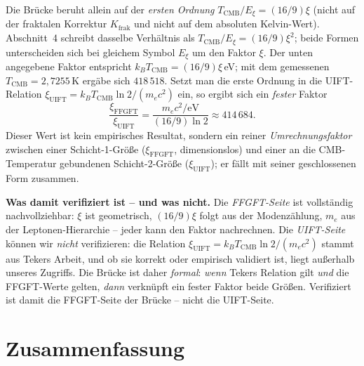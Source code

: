 Die Brücke beruht allein auf der \emph{ersten Ordnung}
$T_{\text{CMB}}/E_\xi = (16/9)\xi$ (nicht auf der fraktalen Korrektur
$K_{\text{frak}}$ und nicht auf dem absoluten Kelvin-Wert).
Abschnitt~4 schreibt dasselbe Verhältnis als $T_{\text{CMB}}/E_\xi=(16/9)\xi^2$;
beide Formen unterscheiden sich bei gleichem Symbol $E_\xi$ um den Faktor $\xi$.
Der unten angegebene Faktor entspricht $k_B T_{\text{CMB}}=(16/9)\xi$\,eV; mit
dem gemessenen $T_{\text{CMB}}=2{,}7255$\,K ergäbe sich $418\,518$. Setzt man die erste Ordnung in
die UIFT-Relation $\xi_{\text{UIFT}} = k_B T_{\text{CMB}}\ln 2/(m_e c^2)$ ein,
so ergibt sich ein \emph{fester} Faktor
\[
  \frac{\xi_{\text{FFGFT}}}{\xi_{\text{UIFT}}}
  = \frac{m_e c^2/\text{eV}}{(16/9)\ln 2} \approx 414\,684 .
\]
Dieser Wert ist kein empirisches Resultat, sondern ein reiner
\emph{Umrechnungsfaktor} zwischen einer Schicht-1-Größe ($\xi_{\text{FFGFT}}$,
dimensionslos) und einer an die CMB-Temperatur gebundenen Schicht-2-Größe
($\xi_{\text{UIFT}}$); er fällt mit seiner geschlossenen Form zusammen.

\textbf{Was damit verifiziert ist -- und was nicht.} Die \emph{FFGFT-Seite}
ist vollständig nachvollziehbar: $\xi$ ist geometrisch, $(16/9)\xi$ folgt aus
der Modenzählung, $m_e$ aus der Leptonen-Hierarchie -- jeder kann den Faktor
nachrechnen. Die \emph{UIFT-Seite} können wir \emph{nicht} verifizieren: die
Relation $\xi_{\text{UIFT}}=k_B T_{\text{CMB}}\ln 2/(m_e c^2)$ stammt aus Tekers
Arbeit, und ob sie korrekt oder empirisch validiert ist, liegt außerhalb
unseres Zugriffs. Die Brücke ist daher \emph{formal}: \emph{wenn} Tekers
Relation gilt \emph{und} die FFGFT-Werte gelten, \emph{dann} verknüpft ein
fester Faktor beide Größen. Verifiziert ist damit die FFGFT-Seite der
Brücke -- nicht die UIFT-Seite.

\section{Zusammenfassung}

